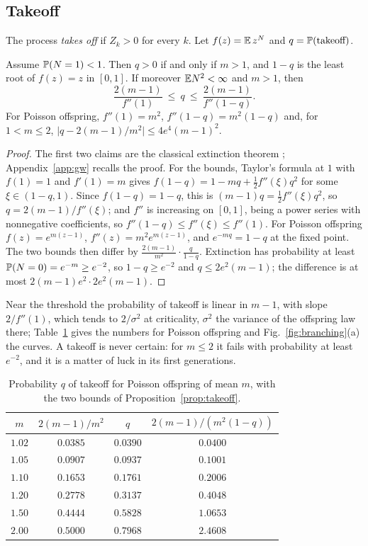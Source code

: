 \subsection{Takeoff}

The process \emph{takes off} if $Z_{k}>0$ for every $k$. Let $f(z)=\mathbb{E}\,z^{N}$ and $q=\mathbb{P}(\text{takeoff})$.

\begin{proposition}\label{prop:takeoff}
Assume $\mathbb{P}(N=1)<1$. Then $q>0$ if and only if $m>1$, and $1-q$ is the least root of $f(z)=z$ in $[0,1]$. If moreover $\mathbb{E} N^{2}<\infty$ and $m>1$, then
\[
\frac{2(m-1)}{f''(1)}\ \le\ q\ \le\ \frac{2(m-1)}{f''(1-q)} .
\]
For Poisson offspring, $f''(1)=m^{2}$, $f''(1-q)=m^{2}(1-q)$ and, for $1<m\le2$, $\bigl|q-2(m-1)/m^{2}\bigr|\le4e^{4}(m-1)^{2}$.
\end{proposition}

\begin{proof}
The first two claims are the classical extinction theorem \cite{AN72,WG75}; Appendix~\ref{app:gw} recalls the proof. For the bounds, Taylor's formula at $1$ with $f(1)=1$ and $f'(1)=m$ gives $f(1-q)=1-mq+\frac12f''(\xi)q^{2}$ for some $\xi\in(1-q,1)$. Since $f(1-q)=1-q$, this is $(m-1)q=\frac12f''(\xi)q^{2}$, so $q=2(m-1)/f''(\xi)$; and $f''$ is increasing on $[0,1]$, being a power series with nonnegative coefficients, so $f''(1-q)\le f''(\xi)\le f''(1)$. For Poisson offspring $f(z)=e^{m(z-1)}$, $f''(z)=m^{2}e^{m(z-1)}$, and $e^{-mq}=1-q$ at the fixed point. The two bounds then differ by $\frac{2(m-1)}{m^{2}}\cdot\frac{q}{1-q}$. Extinction has probability at least $\mathbb{P}(N=0)=e^{-m}\ge e^{-2}$, so $1-q\ge e^{-2}$ and $q\le2e^{2}(m-1)$; the difference is at most $2(m-1)e^{2}\cdot2e^{2}(m-1)$.
\end{proof}

Near the threshold the probability of takeoff is linear in $m-1$, with slope $2/f''(1)$, which tends to $2/\sigma^{2}$ at criticality, $\sigma^{2}$ the variance of the offspring law there; Table~\ref{tab:gw} gives the numbers for Poisson offspring and Fig.~\ref{fig:branching}(a) the curves. A takeoff is never certain: for $m\le2$ it fails with probability at least $e^{-2}$, and it is a matter of luck in its first generations.

\begin{table}[b]
\caption{Probability $q$ of takeoff for Poisson offspring of mean $m$, with the two bounds of Proposition~\ref{prop:takeoff}.}
\label{tab:gw}
\centering
\small
\begin{tabular}{@{}c c c c@{}}
\toprule
$m$ & $2(m-1)/m^{2}$ & $q$ & $2(m-1)/(m^{2}(1-q))$ \\
\midrule
$1.02$ & $0.0385$ & $0.0390$ & $0.0400$ \\
$1.05$ & $0.0907$ & $0.0937$ & $0.1001$ \\
$1.10$ & $0.1653$ & $0.1761$ & $0.2006$ \\
$1.20$ & $0.2778$ & $0.3137$ & $0.4048$ \\
$1.50$ & $0.4444$ & $0.5828$ & $1.0653$ \\
$2.00$ & $0.5000$ & $0.7968$ & $2.4608$ \\
\bottomrule
\end{tabular}
\end{table}

